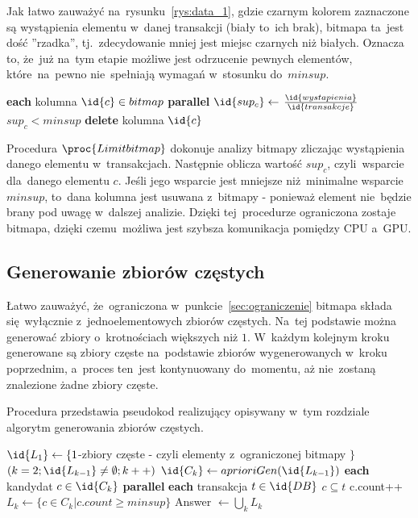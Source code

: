 Jak łatwo zauważyć na~rysunku~\ref{rys:data_1}, gdzie czarnym kolorem zaznaczone są wystąpienia elementu w~danej transakcji (biały to~ich brak), bitmapa ta~jest dość ''rzadka'', tj.~zdecydowanie mniej jest miejsc czarnych niż białych. Oznacza to, że~już na~tym etapie możliwe jest odrzucenie pewnych elementów, które~na~pewno nie~spełniają wymagań w~stosunku do~$minsup$.


\begin{codebox}
		\li \For \textbf{each} kolumna $\id{c} \in bitmap$ \textbf{parallel}
		\li \Do
			\li $\id{sup_c} \gets$ $\frac{\id{wystapienia}}{\id{transakcje}}$
				\li \If $sup_c < minsup$
					\li \Then
						\textbf{delete} kolumna $\id{c}$
					\End
		\End
\end{codebox}

Procedura $\proc{Limit bitmap}$ dokonuje analizy bitmapy zliczając wystąpienia danego elementu w~transakcjach. Następnie oblicza wartość $sup_c$, czyli~wsparcie dla~danego elementu $c$. Jeśli jego wsparcie jest mniejsze niż~minimalne wsparcie $minsup$, to~dana kolumna jest usuwana z~bitmapy - ponieważ element nie~będzie brany pod uwagę w~dalszej analizie. Dzięki tej~procedurze ograniczona zostaje bitmapa, dzięki czemu~możliwa jest szybsza komunikacja pomiędzy CPU a~GPU.

\subsection{Generowanie zbiorów częstych}\label{capriori:gen}

Łatwo zauważyć, że~ograniczona w~punkcie~\ref{sec:ograniczenie} bitmapa składa się~wyłącznie z~jednoelementowych zbiorów częstych. Na~tej podstawie można generować zbiory o~krotnościach większych niż $1$. W~każdym kolejnym kroku generowane są zbiory częste na~podstawie zbiorów wygenerowanych w~kroku poprzednim, a~proces ten~jest kontynuowany do~momentu, aż nie~zostaną znalezione żadne zbiory częste.

Procedura  przedstawia pseudokod realizujący opisywany w~tym rozdziale algorytm generowania zbiorów częstych.

\begin{codebox}
	\label{apriori:listing}
	\li $\id{L_1} \gets \lbrace 1$-zbiory częste - czyli elementy z~ograniczonej bitmapy $\rbrace$
		\li \For $(k = 2; \id{L_{k-1}} \neq \emptyset; k++)$
		\li \Do
			 $\id{C_k} \gets aprioriGen(\id{L_{k-1}})$
			\li \For \textbf{each} kandydat $c \in \id{C_k}$ \textbf{parallel}
			\li \Do
					\li \For \textbf{each} transakcja $t \in \id{DB}$
					\li \If $c \subseteq t$
					\li \Then
						\Do c.count++
						\End
					\End
				\End
			\li $L_k \gets \lbrace c \in C_k | c.count \geq minsup \rbrace$	
		\End
	\li Answer $\gets \bigcup_k L_k $
\end{codebox}

